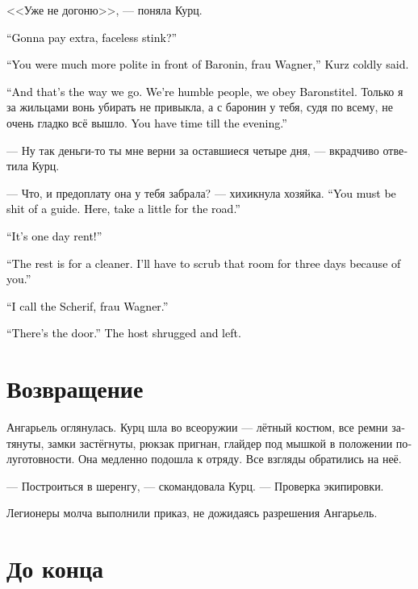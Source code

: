 \documentclass[a4paper,12pt,fleqn]{book}\usepackage{cooltooltips}\usepackage{polyglossia}\setdefaultlanguage[babelshorthands=true]{russian}\setotherlanguage{english}\defaultfontfeatures{Ligatures=TeX,Mapping=tex-text} \usepackage{xcolor}\definecolor{lightgray}{HTML}{bbbbbb}\color{lightgray}\newcommand{\ml}[3]{\textenglish{\textcolor{black}{#3}}}
\begin{document}
<<Уже не догоню>>, --- поняла Курц.

\ml{$0$}
{--- Ты доплачивать-то будешь, вонючка безликая?}
{``Gonna pay extra, faceless stink?''}

\ml{$0$}
{--- Что-то при баронин вы были гораздо вежливее, фрау Вагнер, --- холодно сказала Курц.}
{``You were much more polite in front of Baronin, frau Wagner,'' Kurz coldly said.}

\ml{$0$}
{--- А так оно и будет.}
{``And that's the way we go.}
\ml{$0$}
{Мы люди маленькие, баронство слушаем.}
{We're humble people, we obey Baronstitel.}
Только я за жильцами вонь убирать не привыкла, а с баронин у тебя, судя по всему, не очень гладко всё вышло.
\ml{$0$}
{Даю время до вечера.}
{You have time till the evening.''}

--- Ну так деньги-то ты мне верни за оставшиеся четыре дня, --- вкрадчиво ответила Курц.

--- Что, и предоплату она у тебя забрала? --- хихикнула хозяйка.
\ml{$0$}
{--- Паршивый же из тебя проводник, должно быть.}
{``You must be shit of a guide.}
\ml{$0$}
{На, держи на дорожку.}
{Here, take a little for the road.''}

\ml{$0$}
{--- Тут за один день!}
{``It's one day rent!''}

\ml{$0$}
{--- Остальное на уборщика.}
{``The rest is for a cleaner.}
\ml{$0$}
{Из-за тебя я комнату ещё три дня драить буду.}
{I'll have to scrub that room for three days because of you.''}

\ml{$0$}
{--- Я позову шерифа, фрау Вагнер.}
{``I call the Scherif, frau Wagner.''}

\ml{$0$}
{--- Дверь вон там, --- хозяйка пожала плечами и ушла.}
{``There's the door.'' The host shrugged and left.}

\section{Возвращение}

Ангарьель оглянулась.
Курц шла во всеоружии --- лётный костюм, все ремни затянуты, замки застёгнуты, рюкзак пригнан, глайдер под мышкой в положении полуготовности.
Она медленно подошла к отряду.
Все взгляды обратились на неё.

--- Построиться в шеренгу, --- скомандовала Курц.
--- Проверка экипировки.

Легионеры молча выполнили приказ, не дожидаясь разрешения Ангарьель.

\section{До конца}
\end{document}
